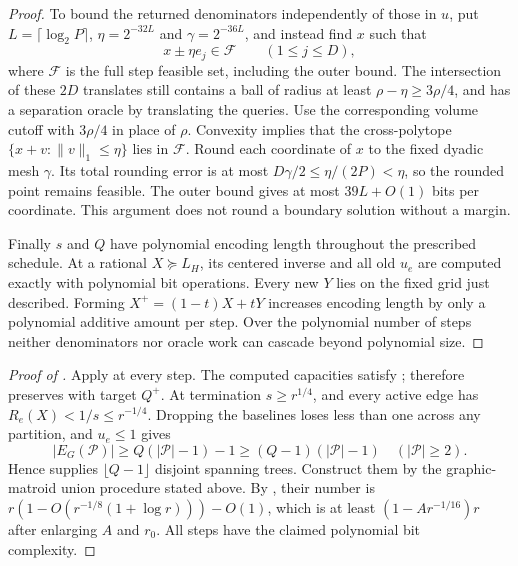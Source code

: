 \begin{proof}
To bound the returned denominators independently of those in $u$, put
$L=\lceil\log_2P\rceil$, $\eta=2^{-32L}$ and $\gamma=2^{-36L}$,
and instead find $x$ such that
\begin{equation}
                         x\pm\eta e_j\in\mathcal F
                          \qquad(1\le j\le D),
 \label{eq:ta-translated}
\end{equation}
where $\mathcal F$ is the full step feasible set, including the outer
bound. The intersection of these $2D$ translates still contains a ball
of radius at least $\rho-\eta\ge3\rho/4$, and has a separation oracle
by translating the queries. Use the corresponding volume cutoff with
$3\rho/4$ in place of $\rho$. Convexity implies that the cross-polytope
$\{x+v:\|v\|_1\le\eta\}$ lies in $\mathcal F$.
Round each coordinate of $x$ to the fixed dyadic mesh $\gamma$.
Its total rounding error is at most
$D\gamma/2\le\eta/(2P)<\eta$, so the rounded point remains feasible.
The outer bound gives at most $39L+O(1)$ bits per coordinate.
This argument does not round a
boundary solution without a margin.

Finally $s$ and $Q$ have polynomial encoding length throughout the
prescribed schedule. At a rational $X\succeq L_H$, its centered inverse
and all old $u_e$ are computed exactly with polynomial bit operations.
Every new $Y$ lies on the fixed grid just described. Forming
$X^+=(1-t)X+tY$ increases encoding length by only a polynomial additive
amount per step. Over the polynomial number of steps neither
denominators nor oracle work can cascade beyond polynomial size.
\end{proof}

\begin{proof}[Proof of ]
Apply  at every step.
The computed capacities satisfy ;
 therefore preserves
 with target $Q^+$. At termination $s\ge r^{1/4}$,
and every active edge has $R_e(X)<1/s\le r^{-1/4}$.
Dropping the baselines loses less than one across any partition, and
$u_e\le1$ gives
\[
 |E_G(\mathcal P)|\ge Q(|\mathcal P|-1)-1
       \ge (Q-1)(|\mathcal P|-1)
                   \quad(|\mathcal P|\ge2).
\]
Hence  supplies
$\lfloor Q-1\rfloor$ disjoint spanning trees. Construct them by the
graphic-matroid union procedure stated above. By
, their number is
$r(1-O(r^{-1/8}(1+\log r)))-O(1)$, which is at least
$(1-Ar^{-1/16})r$ after enlarging $A$ and $r_0$. All steps have the
claimed polynomial bit complexity.
\end{proof}
